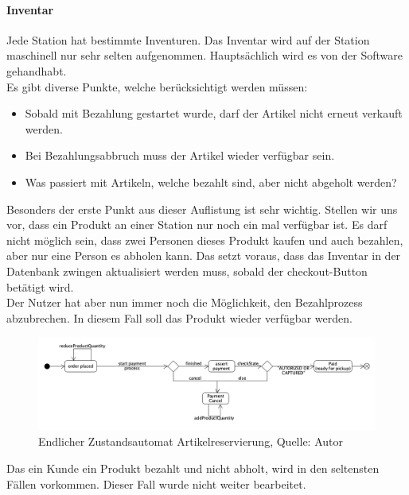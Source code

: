 \paragraph{Inventar}
Jede Station hat bestimmte Inventuren. Das Inventar wird auf der Station maschinell nur sehr selten aufgenommen. Hauptsächlich wird es von der Software gehandhabt.  \\
Es gibt diverse Punkte, welche berücksichtigt werden müssen: 
\begin{itemize}
	\item Sobald mit Bezahlung gestartet wurde, darf der Artikel nicht erneut verkauft werden.
	\item Bei Bezahlungsabbruch muss der Artikel wieder verfügbar sein.
	\item Was passiert mit Artikeln, welche bezahlt sind, aber nicht abgeholt werden?
\end{itemize}
Besonders der erste Punkt aus dieser Auflistung ist sehr wichtig. Stellen wir uns vor, dass ein Produkt an einer Station nur noch ein mal verfügbar ist. Es darf nicht möglich sein, dass zwei Personen dieses Produkt kaufen und auch bezahlen, aber nur eine Person es abholen kann. Das setzt voraus, dass das Inventar in der Datenbank zwingen aktualisiert werden muss, sobald der checkout-Button betätigt wird.\\
Der Nutzer hat aber nun immer noch die Möglichkeit, den Bezahlprozess abzubrechen. In diesem Fall soll das Produkt wieder verfügbar werden. 
 \begin{figure}[H]
 	\centering
 	\includegraphics[width=1\textwidth]{images/stateMachineOrder.PNG}
 	\caption[Endlicher Zustandsautomat Artikelreservierung]{Endlicher Zustandsautomat Artikelreservierung, Quelle: Autor}
 	\label{img: stateMachine}
 \end{figure}

Das ein Kunde ein Produkt bezahlt und nicht abholt, wird in den seltensten Fällen vorkommen. Dieser Fall wurde nicht weiter bearbeitet. 


